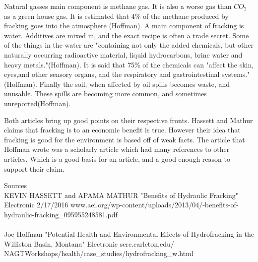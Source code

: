 \documentclass[12pt]{article}
\begin{document}
Natural gasses main component is 
methane gas. It is also a worse gas than $CO_2$ as a green house gas. It is estimated that 4\% of the methane produced by fracking goes into the atmosphere (Hoffman). A main component of fracking is water. Additives are mixed in, and the exact recipe is often a trade secret. Some of the things in the water are "containing not only the added chemicals, but other naturally occurring radioactive material, liquid hydrocarbons, brine water and heavy metals."(Hoffman). It is said that 75\% of the chemicals can "affect the skin, eyes,and other sensory organs, and the respiratory and gastrointestinal systems." (Hoffman). Finally the soil, when affected by oil spills becomes waste, and unusable. These spills are becoming more common, and sometimes unreported(Hoffman).

Both articles bring up good points on their respective fronts. Hassett and Mathur claims that fracking is to an economic benefit is true. However their idea that fracking is good for the environment is based off of weak facts. The article that Hoffman wrote was a scholarly article which had many references to other articles. Which is a good basis for an article, and a good enough reason to support their claim.  

\singlespacing
\noindent \large{Sources}\\
KEVIN HASSETT and APAMA MATHUR "Benefits of Hydraulic Fracking" Electronic 
2/17/2016 www.aei.org/wp-content/uploads/2013/04/-benefits-of-hydraulic-fracking\_095955248581.pdf 
\\
\\
Joe Hoffman "Potential Health and Environmental Effects of Hydrofracking in the Williston Basin, Montana" Electronic serc.carleton.edu/ NAGTWorkshops/health/case\_studies/hydrofracking\_w.html
\end{document}

